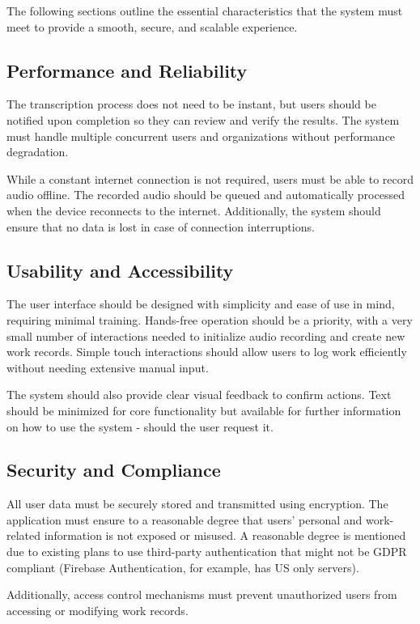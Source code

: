 \documentclass[
  digital,     %
  oneside,     %
  nosansbold,  %
  nocolorbold, %
  lof,         %
  lot,         %
]{fithesis4}
\begin{document}
The following sections outline the essential characteristics that the system must meet to provide a smooth, secure, and scalable experience.

\subsection{Performance and Reliability}  
The transcription process does not need to be instant, but users should be notified upon completion so they can review and verify the results. The system must handle multiple concurrent users and organizations without performance degradation.

While a constant internet connection is not required, users must be able to record audio offline. The recorded audio should be queued and automatically processed when the device reconnects to the internet. Additionally, the system should ensure that no data is lost in case of connection interruptions.

\subsection{Usability and Accessibility}  
The user interface should be designed with simplicity and ease of use in mind, requiring minimal training. Hands-free operation should be a priority, with a very small number of interactions needed to initialize audio recording and create new work records. Simple touch interactions should allow users to log work efficiently without needing extensive manual input.

The system should also provide clear visual feedback to confirm actions. Text should be minimized for core functionality but available for further information on how to use the system - should the user request it.

\subsection{Security and Compliance}  
All user data must be securely stored and transmitted using encryption. The application must ensure to a reasonable degree that users’ personal and work-related information is not exposed or misused. A reasonable degree is mentioned due to existing plans to use third-party authentication that might not be \gls{GDPR} compliant (Firebase Authentication, for example, has US only servers).

Additionally, access control mechanisms must prevent unauthorized users from accessing or modifying work records.
\end{document}
